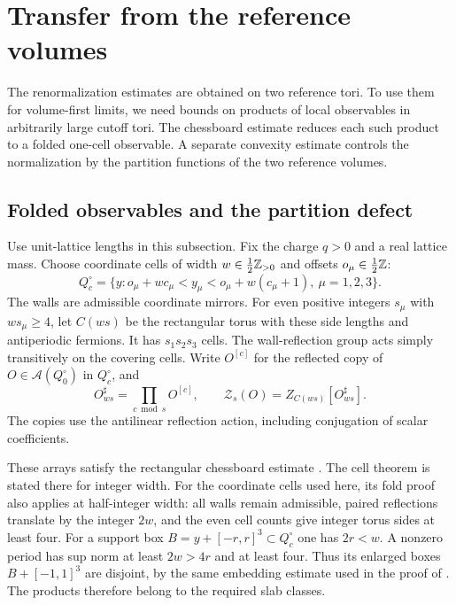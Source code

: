 \section{Transfer from the reference volumes}\label{sec:uniform-transfer}

The renormalization estimates are obtained on two reference tori.
To use them for volume-first limits, we need bounds on products
of local observables in arbitrarily large cutoff tori. The
chessboard estimate reduces each such product to a folded
one-cell observable. A separate convexity estimate controls
the normalization by the partition functions of the two
reference volumes.

\subsection{Folded observables and the partition defect}

Use unit-lattice lengths in this subsection. Fix the charge $q>0$
and a real lattice mass. Choose coordinate cells of width
$w\in\tfrac12\mathbb Z_{>0}$ and offsets $o_\mu\in\tfrac12\mathbb Z$:
\[
 Q_c^\circ=\{y:o_\mu+wc_\mu<y_\mu<o_\mu+w(c_\mu+1),\
                           \mu=1,2,3\}.
\]
The walls are admissible coordinate mirrors. For even positive
integers $s_\mu$ with $ws_\mu\ge4$, let $C(ws)$ be the rectangular
torus with these side lengths and antiperiodic fermions.
It has $s_1s_2s_3$ cells. The wall-reflection group acts simply
transitively on the covering cells. Write $O^{[c]}$ for the
reflected copy of $O\in\mathcal A(Q_0^\circ)$ in $Q_c^\circ$,
and
\[
 O^\sharp_{ws}=\prod_{c\bmod s}O^{[c]},\qquad
 \mathcal Z_s(O)=Z_{C(ws)}[O^\sharp_{ws}].
\]
The copies use the antilinear reflection action, including
conjugation of scalar coefficients.

These arrays satisfy the rectangular chessboard estimate
\cite[(69)]{ChamberLattice}. The cell theorem is stated there for integer width.
For the coordinate cells used here, its fold proof also applies
at half-integer width: all walls remain admissible, paired
reflections translate by the integer $2w$, and the even cell
counts give integer torus sides at least four.
For a support box $B=y+[-r,r]^3\subset Q_c^\circ$ one has
$2r<w$. A nonzero period has sup norm at least $2w>4r$
and at least four. Thus its enlarged boxes $B+[-1,1]^3$
are disjoint, by the same embedding estimate used in the
proof of \cite[Proposition~4.3]{ChamberLattice}.
The products therefore belong to the required slab classes.

